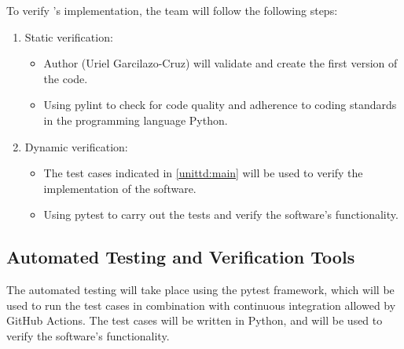\documentclass[12pt, titlepage]{article}
\begin{document}
To verify \progname{}'s implementation, the team will follow the following steps:
\begin{enumerate}
  \item Static verification:
  \begin{itemize}
    \item Author (Uriel Garcilazo-Cruz) will validate and create the first version of the code.
    \item Using pylint to check for code quality and adherence to coding standards in the
    programming language Python.
  \end{itemize}
  
  \item Dynamic verification:
  \begin{itemize}
    \item The test cases indicated in \autoref{unittd:main} will be used to verify the implementation of the software.
    \item Using pytest to carry out the tests and verify the software's functionality.
  \end{itemize}

\end{enumerate}




\subsection{Automated Testing and Verification Tools}

The automated testing will take place using the pytest framework, which will be used to run the test cases
in combination with continuous integration allowed by GitHub Actions. The test cases will be written in Python,
and will be used to verify the software's functionality.

\end{document}
